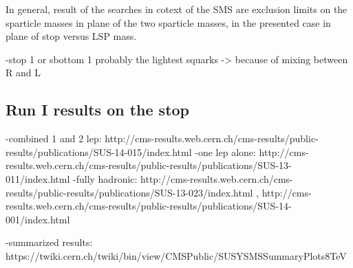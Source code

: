 In general, result of the searches in cotext of the SMS are exclusion limits on the sparticle masses in plane of the two sparticle masses, in the presented case in plane of  stop versus LSP mass.



-stop 1 or sbottom 1 probably the lightest squarks  -> because of mixing between R and L 


\subsection{Run I results on the stop}

-combined 1 and 2 lep: http://cms-results.web.cern.ch/cms-results/public-results/publications/SUS-14-015/index.html
-one lep alone: http://cms-results.web.cern.ch/cms-results/public-results/publications/SUS-13-011/index.html
-fully hadronic: http://cms-results.web.cern.ch/cms-results/public-results/publications/SUS-13-023/index.html , http://cms-results.web.cern.ch/cms-results/public-results/publications/SUS-14-001/index.html

-summarized results: https://twiki.cern.ch/twiki/bin/view/CMSPublic/SUSYSMSSummaryPlots8TeV
